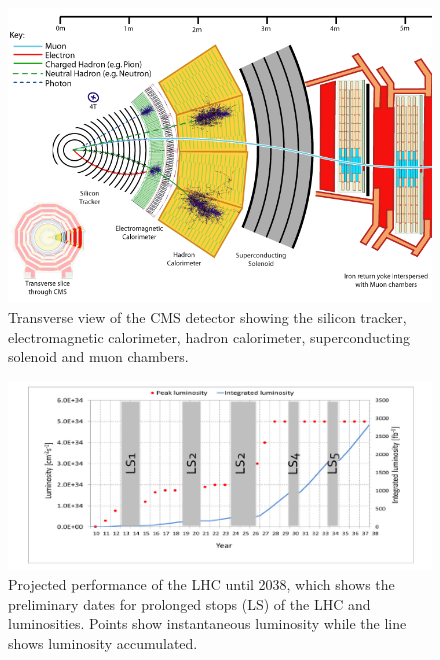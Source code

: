 \documentclass[final,3p]{CSP}
\begin{document}
  \begin{figure}[H]
    \centering
    \includegraphics[width=0.6\columnwidth]{./cms12.png}
    \caption{Transverse view of the CMS detector showing the silicon tracker, electromagnetic calorimeter, hadron calorimeter, superconducting solenoid and muon chambers.}
    \label{figure5}
  \end{figure}
  
  \begin{figure}[H]
    \centering
    \includegraphics[width=0.9\columnwidth]{./lum6.png}
    \caption{Projected performance of the LHC until 2038, which shows the preliminary dates for prolonged stops (LS) of the LHC and luminosities. Points show instantaneous luminosity while the line shows luminosity accumulated.}
    \label{figure6}
  \end{figure}
  \clearpage


\end{document}
